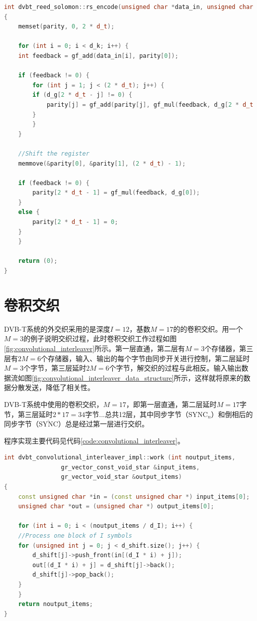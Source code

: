 		\begin{lstlisting}[caption = {RS编码}, label = {code:rs_encode}, language = C++ ]
int dvbt_reed_solomon::rs_encode(unsigned char *data_in, unsigned char *parity)
{
	memset(parity, 0, 2 * d_t);

	for (int i = 0; i < d_k; i++) {
	int feedback = gf_add(data_in[i], parity[0]);

	if (feedback != 0) {
		for (int j = 1; j < (2 * d_t); j++) {
		if (d_g[2 * d_t - j] != 0) {
			parity[j] = gf_add(parity[j], gf_mul(feedback, d_g[2 * d_t - j]));
		}
		}
	}

	//Shift the register
	memmove(&parity[0], &parity[1], (2 * d_t) - 1);

	if (feedback != 0) {
		parity[2 * d_t - 1] = gf_mul(feedback, d_g[0]);
	}
	else {
		parity[2 * d_t - 1] = 0;
	}
	}

	return (0);
}
		\end{lstlisting}
	\section{卷积交织}
		\par DVB-T系统的外交织采用的是深度$I=12$，基数$M=17$的的卷积交织。用一个$M=3$的例子说明交织过程，此时卷积交织工作过程如图\ref{fig:convolutional_interleaver}所示。第一层直通，第二层有$M=3$个存储器，第三层有$2M=6$个存储器，输入、输出的每个字节由同步开关进行控制，第二层延时$M=3$个字节，第三层延时$2M=6$个字节，解交织的过程与此相反。输入输出数据流如图\ref{fig:convolutional_interleaver_data_structure}所示，这样就将原来的数据分散发送，降低了相关性。
		
		
		\par DVB-T系统中使用的卷积交织，$M=17$，即第一层直通，第二层延时$M=17$字节，第三层延时$2*17=34$字节...总共12层，其中同步字节（$\text{SYNC}_n$）和倒相后的同步字节（$\overline{\text{SYNC}}$）总是经过第一层进行交织。
		\par 程序实现主要代码见代码\ref{code:convolutional_interleaver}。
		\begin{lstlisting}[caption = {卷积交织},label = {code:convolutional_interleaver},language = C++ ]
int dvbt_convolutional_interleaver_impl::work (int noutput_items,
				gr_vector_const_void_star &input_items,
				gr_vector_void_star &output_items)
{
	const unsigned char *in = (const unsigned char *) input_items[0];
	unsigned char *out = (unsigned char *) output_items[0];

	for (int i = 0; i < (noutput_items / d_I); i++) {
	//Process one block of I symbols
	for (unsigned int j = 0; j < d_shift.size(); j++) {
		d_shift[j]->push_front(in[(d_I * i) + j]);
		out[(d_I * i) + j] = d_shift[j]->back();
		d_shift[j]->pop_back();
	}
	}
	return noutput_items;
}
		\end{lstlisting}
